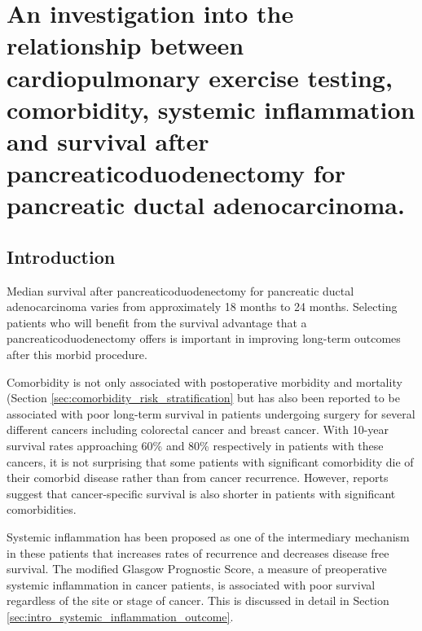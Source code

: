 
\chapter{An investigation into the relationship between cardiopulmonary exercise testing, comorbidity, systemic inflammation and survival after pancreaticoduodenectomy for pancreatic ductal adenocarcinoma.}
\label{ch_survival}


\clearpage


\section{Introduction}
Median survival after pancreaticoduodenectomy for pancreatic ductal adenocarcinoma varies from approximately 18 months to 24 months.\parencite{winter_1423_2006,neoptolemos_adjuvant_2010}  Selecting patients who will benefit from the survival advantage that a pancreaticoduodenectomy offers is important in improving long-term outcomes after this morbid procedure.

Comorbidity is not only associated with postoperative morbidity and mortality (Section \ref{sec:comorbidity_risk_stratification} but has also been reported to be associated with poor long-term survival in patients undergoing surgery for several different cancers including colorectal cancer \parencite{} and breast cancer.\parencite{} With 10-year survival rates approaching 60\% and 80\% respectively in patients with these cancers, it is not surprising that some patients with significant comorbidity die of their comorbid disease rather than from cancer recurrence. However, reports suggest that cancer-specific survival is also shorter in patients with significant comorbidities.

Systemic inflammation has been proposed as one of the intermediary mechanism in these patients that increases rates of recurrence and decreases disease free survival. The modified Glasgow Prognostic Score, a measure of preoperative systemic inflammation in cancer patients, is associated with poor survival regardless of the site or stage of cancer. This is discussed in detail in Section \ref{sec:intro_systemic_inflammation_outcome}.

